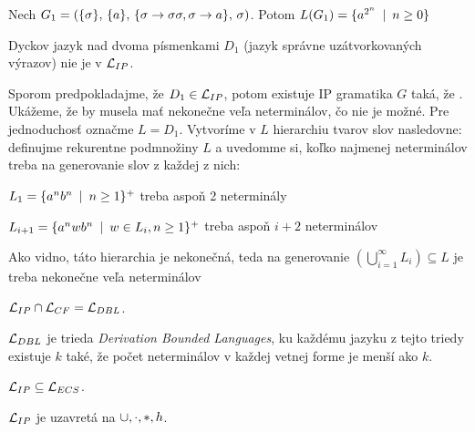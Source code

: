 \begin{priklad}
  Nech $G_1= (\{\sigma\},\,\{a\},\,
      \{\sigma \rightarrow \sigma \sigma, \sigma \rightarrow a\}
    ,\,\sigma)$.
  Potom $L(G_1) = \{a^{2^n} \enspace |\enspace n \ge 0\}$
\end{priklad}

\begin{priklad}
  Dyckov jazyk nad dvoma písmenkami $D_{1}$ (jazyk správne
  uzátvorkovaných výrazov) nie je v $\mathcal{L}_{IP}$.
\end{priklad}

\begin{dokaz}
  Sporom predpokladajme, že $D_1 \in \mathcal{L}_{IP}$, potom
  existuje IP gramatika $G$ taká, že .
  Ukážeme, že by musela mať nekonečne veľa neterminálov, čo nie je možné.
  Pre jednoduchosť označme $L = D_1$.
  Vytvoríme v $L$ hierarchiu tvarov slov nasledovne:
  definujme rekurentne podmnožiny $L$ a uvedomme si,
  koľko najmenej neterminálov treba na generovanie slov z každej z nich:
  \begin{description}
    \item $L_1 = \{a^n b^n \enspace |\enspace n \ge 1\}^{+}$ treba aspoň 2
      neterminály
    \item $L_{i+1} = \{a^n w b^n \enspace |\enspace w \in L_{i}, n\ge 1\}^{+}$
      treba aspoň $i+2$ neterminálov
  \end{description}
  Ako vidno, táto hierarchia je nekonečná, teda na generovanie
  $(\bigcup_{i=1}^{\infty}L_{i})\subseteq L$ je treba nekonečne veľa
  neterminálov
\end{dokaz}

\begin{veta}
  $\mathcal{L}_{IP} \cap \mathcal{L}_{CF} = \mathcal{L}_{DBL}$.
\end{veta}

\begin{poznamka}
  $\mathcal{L}_{DBL}$ je trieda {\it Derivation Bounded Languages},
  ku každému jazyku z tejto triedy existuje $k$ také, že počet
  neterminálov v každej vetnej forme je menší ako $k$.
\end{poznamka}

\begin{veta}
  $\mathcal{L}_{IP} \subseteq \mathcal{L}_{ECS}$.
\end{veta}

\begin{veta}
  $\mathcal{L}_{IP}$ je uzavretá na $\cup,\cdot,*,h$.
\end{veta}

